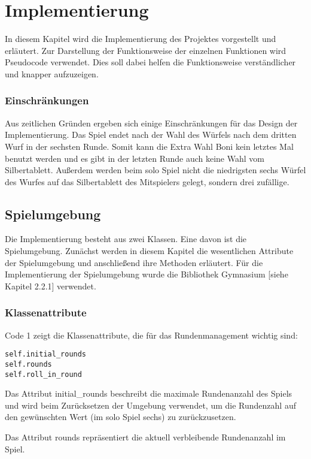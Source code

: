 \section{Implementierung}
In diesem Kapitel wird die Implementierung des Projektes vorgestellt und erläutert. Zur Darstellung der Funktionsweise der einzelnen Funktionen wird Pseudocode verwendet. Dies soll dabei helfen die Funktionsweise verständlicher und knapper aufzuzeigen.
\subsubsection{Einschränkungen}
Aus zeitlichen Gründen ergeben sich einige Einschränkungen für das Design der Implementierung. Das Spiel endet nach der Wahl des Würfels nach dem dritten Wurf in der sechsten Runde. Somit kann die Extra Wahl Boni kein letztes Mal benutzt werden und es gibt in der letzten Runde auch keine Wahl vom Silbertablett. Außerdem werden beim solo Spiel nicht die niedrigsten sechs Würfel des Wurfes auf das Silbertablett des Mitspielers gelegt, sondern drei zufällige.
\subsection{Spielumgebung}
Die Implementierung besteht aus zwei Klassen. Eine davon ist die Spielumgebung. Zunächst werden in diesem Kapitel die wesentlichen Attribute der Spielumgebung und anschließend ihre Methoden erläutert. Für die Implementierung der Spielumgebung wurde die Bibliothek Gymnasium [siehe Kapitel 2.2.1] verwendet.
\subsubsection{Klassenattribute}
\begin{minipage}{\linewidth}
Code 1 zeigt die Klassenattribute, die für das Rundenmanagement wichtig sind:
\vspace{0.5cm}
\begin{lstlisting}[caption={Klassenattribute für das Runden-System}, basicstyle=\ttfamily]
self.initial_rounds
self.rounds
self.roll_in_round
\end{lstlisting}
\end{minipage}

Das Attribut initial\_rounds beschreibt die maximale Rundenanzahl des Spiels und wird beim Zurücksetzen der Umgebung verwendet, um die Rundenzahl auf den gewünschten Wert (im solo Spiel sechs) zu zurückzusetzen.

Das Attribut rounds repräsentiert die aktuell verbleibende Rundenanzahl im Spiel.

